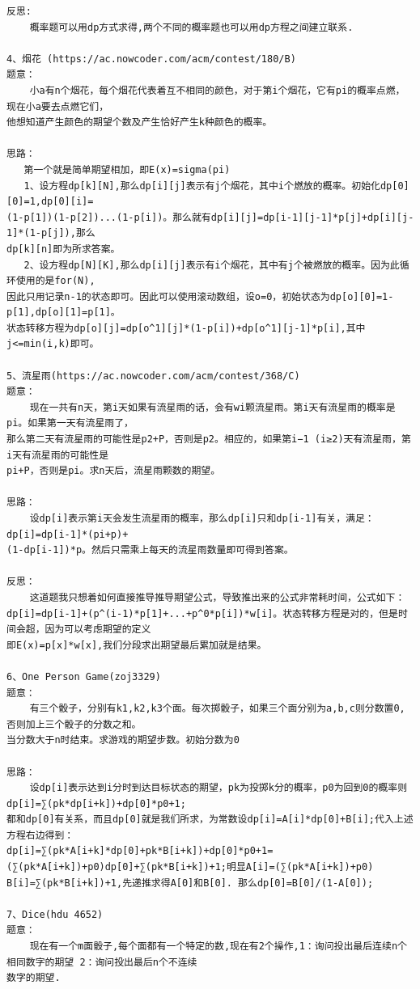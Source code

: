 \documentclass[twoside]{article}
\begin{document}
\begin{lstlisting}
反思:
    概率题可以用dp方式求得,两个不同的概率题也可以用dp方程之间建立联系.
    
4、烟花 (https://ac.nowcoder.com/acm/contest/180/B)
题意：
    小a有n个烟花，每个烟花代表着互不相同的颜色，对于第i个烟花，它有pi的概率点燃，现在小a要去点燃它们，
他想知道产生颜色的期望个数及产生恰好产生k种颜色的概率。

思路：
   第一个就是简单期望相加，即E(x)=sigma(pi)
   1、设方程dp[k][N],那么dp[i][j]表示有j个烟花，其中i个燃放的概率。初始化dp[0][0]=1,dp[0][i]=
(1-p[1])(1-p[2])...(1-p[i])。那么就有dp[i][j]=dp[i-1][j-1]*p[j]+dp[i][j-1]*(1-p[j]),那么
dp[k][n]即为所求答案。
   2、设方程dp[N][K],那么dp[i][j]表示有i个烟花，其中有j个被燃放的概率。因为此循环使用的是for(N),
因此只用记录n-1的状态即可。因此可以使用滚动数组，设o=0，初始状态为dp[o][0]=1-p[1],dp[o][1]=p[1]。
状态转移方程为dp[o][j]=dp[o^1][j]*(1-p[i])+dp[o^1][j-1]*p[i],其中j<=min(i,k)即可。

5、流星雨(https://ac.nowcoder.com/acm/contest/368/C)
题意：
    现在一共有n天，第i天如果有流星雨的话，会有wi颗流星雨。第i天有流星雨的概率是pi。如果第一天有流星雨了，
那么第二天有流星雨的可能性是p2+P，否则是p2。相应的，如果第i−1 (i≥2)天有流星雨，第i天有流星雨的可能性是
pi+P，否则是pi。求n天后，流星雨颗数的期望。

思路：
    设dp[i]表示第i天会发生流星雨的概率，那么dp[i]只和dp[i-1]有关，满足：dp[i]=dp[i-1]*(pi+p)+
(1-dp[i-1])*p。然后只需乘上每天的流星雨数量即可得到答案。

反思：
    这道题我只想着如何直接推导推导期望公式，导致推出来的公式非常耗时间，公式如下：
dp[i]=dp[i-1]+(p^(i-1)*p[1]+...+p^0*p[i])*w[i]。状态转移方程是对的，但是时间会超，因为可以考虑期望的定义
即E(x)=p[x]*w[x],我们分段求出期望最后累加就是结果。

6、One Person Game(zoj3329)
题意：
    有三个骰子，分别有k1,k2,k3个面。每次掷骰子，如果三个面分别为a,b,c则分数置0,否则加上三个骰子的分数之和。
当分数大于n时结束。求游戏的期望步数。初始分数为0

思路：
    设dp[i]表示达到i分时到达目标状态的期望，pk为投掷k分的概率，p0为回到0的概率则dp[i]=∑(pk*dp[i+k])+dp[0]*p0+1;
都和dp[0]有关系，而且dp[0]就是我们所求，为常数设dp[i]=A[i]*dp[0]+B[i];代入上述方程右边得到：
dp[i]=∑(pk*A[i+k]*dp[0]+pk*B[i+k])+dp[0]*p0+1=(∑(pk*A[i+k])+p0)dp[0]+∑(pk*B[i+k])+1;明显A[i]=(∑(pk*A[i+k])+p0)
B[i]=∑(pk*B[i+k])+1,先递推求得A[0]和B[0]. 那么dp[0]=B[0]/(1-A[0]);

7、Dice(hdu 4652)
题意：
    现在有一个m面骰子,每个面都有一个特定的数,现在有2个操作,1：询问投出最后连续n个相同数字的期望 2：询问投出最后n个不连续
数字的期望.


\end{lstlisting}
\end{document}
